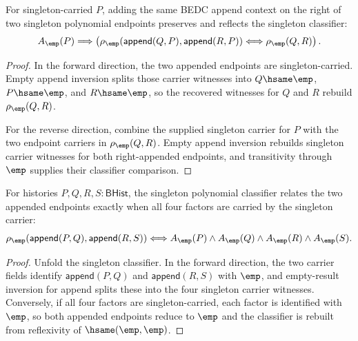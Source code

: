 \begin{theorem}
\label{thm:polynomial-singleton-classifier-append-right-cancel}
For singleton-carried $P$, adding the same BEDC append context on the right of
two singleton polynomial endpoints preserves and reflects the singleton
classifier:
$$
A_{\emp}(P)\Longrightarrow
\left(
\rho_{\emp}(\mathsf{append}(Q,P),\mathsf{append}(R,P))
\Longleftrightarrow
\rho_{\emp}(Q,R)
\right).
$$
\end{theorem}
\begin{proof}
In the forward direction, the two appended endpoints are singleton-carried.
Empty append inversion splits those carrier witnesses into $Q\hsame\emp$,
$P\hsame\emp$, and $R\hsame\emp$, so the recovered witnesses for $Q$ and $R$
rebuild $\rho_{\emp}(Q,R)$.

For the reverse direction, combine the supplied singleton carrier for $P$ with
the two endpoint carriers in $\rho_{\emp}(Q,R)$. Empty append inversion
rebuilds singleton carrier witnesses for both right-appended endpoints, and
transitivity through $\emp$ supplies their classifier comparison.
\end{proof}

\begin{theorem}
\label{thm:polynomial-singleton-classifier-append-pair-carrier}
For histories $P,Q,R,S:\mathsf{BHist}$, the singleton polynomial classifier
relates the two appended endpoints exactly when all four factors are carried
by the singleton carrier:
$$
\rho_{\emp}(\mathsf{append}(P,Q),\mathsf{append}(R,S))
\Longleftrightarrow
A_{\emp}(P)\land A_{\emp}(Q)\land A_{\emp}(R)\land A_{\emp}(S).
$$
\end{theorem}
\begin{proof}
Unfold the singleton classifier. In the forward direction, the two carrier
fields identify $\mathsf{append}(P,Q)$ and $\mathsf{append}(R,S)$ with
$\emp$, and empty-result inversion for append splits these into the four
singleton carrier witnesses. Conversely, if all four factors are
singleton-carried, each factor is identified with $\emp$, so both appended
endpoints reduce to $\emp$ and the classifier is rebuilt from reflexivity of
$\hsame(\emp,\emp)$.
\end{proof}


